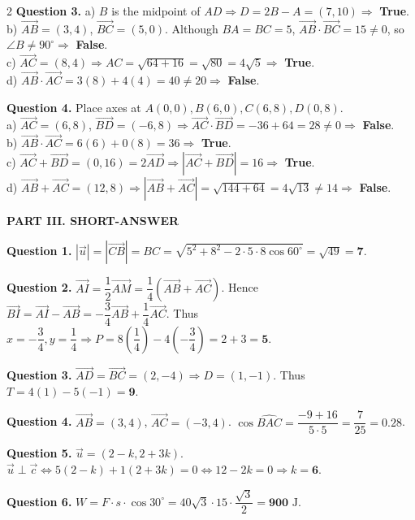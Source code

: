 \documentclass[10pt,a4paper]{article}
\begin{document}
\begin{multicols}{2}
\textbf{Question 3.}
a) $B$ is the midpoint of $AD \Rightarrow D = 2B - A = (7, 10) \Rightarrow$ \textbf{True}.\\
b) $\vec{AB} = (3, 4)$, $\vec{BC} = (5, 0)$. Although $BA = BC = 5$, $\vec{AB} \cdot \vec{BC} = 15 \ne 0$, so $\angle B \ne 90^\circ \Rightarrow$ \textbf{False}.\\
c) $\vec{AC} = (8, 4) \Rightarrow AC = \sqrt{64 + 16} = \sqrt{80} = 4\sqrt{5} \Rightarrow$ \textbf{True}.\\
d) $\vec{AB} \cdot \vec{AC} = 3(8) + 4(4) = 40 \ne 20 \Rightarrow$ \textbf{False}.

\textbf{Question 4.} Place axes at $A(0, 0), B(6, 0), C(6, 8), D(0, 8)$.\\
a) $\vec{AC} = (6, 8)$, $\vec{BD} = (-6, 8) \Rightarrow \vec{AC} \cdot \vec{BD} = -36 + 64 = 28 \ne 0 \Rightarrow$ \textbf{False}.\\
b) $\vec{AB} \cdot \vec{AC} = 6(6) + 0(8) = 36 \Rightarrow$ \textbf{True}.\\
c) $\vec{AC} + \vec{BD} = (0, 16) = 2\vec{AD} \Rightarrow |\vec{AC} + \vec{BD}| = 16 \Rightarrow$ \textbf{True}.\\
d) $\vec{AB} + \vec{AC} = (12, 8) \Rightarrow |\vec{AB} + \vec{AC}| = \sqrt{144 + 64} = 4\sqrt{13} \ne 14 \Rightarrow$ \textbf{False}.

\textbf{\color{accent}PART III. SHORT-ANSWER}

\textbf{Question 1.} $|\vec{u}| = |\vec{CB}| = BC = \sqrt{5^2 + 8^2 - 2\cdot 5\cdot 8\cos 60^\circ} = \sqrt{49} = \mathbf{7}$.

\textbf{Question 2.} $\vec{AI} = \dfrac{1}{2}\vec{AM} = \dfrac{1}{4}(\vec{AB} + \vec{AC})$. Hence $\vec{BI} = \vec{AI} - \vec{AB} = -\dfrac{3}{4}\vec{AB} + \dfrac{1}{4}\vec{AC}$. Thus $x = -\dfrac{3}{4}, y = \dfrac{1}{4} \Rightarrow P = 8\left(\dfrac{1}{4}\right) - 4\left(-\dfrac{3}{4}\right) = 2 + 3 = \mathbf{5}$.

\textbf{Question 3.} $\vec{AD} = \vec{BC} = (2, -4) \Rightarrow D = (1, -1)$. Thus $T = 4(1) - 5(-1) = \mathbf{9}$.

\textbf{Question 4.} $\vec{AB} = (3, 4)$, $\vec{AC} = (-3, 4)$. $\cos\widehat{BAC} = \dfrac{-9 + 16}{5 \cdot 5} = \dfrac{7}{25} = \mathbf{0.28}$.

\textbf{Question 5.} $\vec{u} = (2 - k, 2 + 3k)$. $\vec{u} \perp \vec{c} \Leftrightarrow 5(2 - k) + 1(2 + 3k) = 0 \Leftrightarrow 12 - 2k = 0 \Rightarrow k = \mathbf{6}$.

\textbf{Question 6.} $W = F \cdot s \cdot \cos 30^\circ = 40\sqrt{3} \cdot 15 \cdot \dfrac{\sqrt{3}}{2} = \mathbf{900}\text{ J}$.


\end{multicols}
\end{document}
